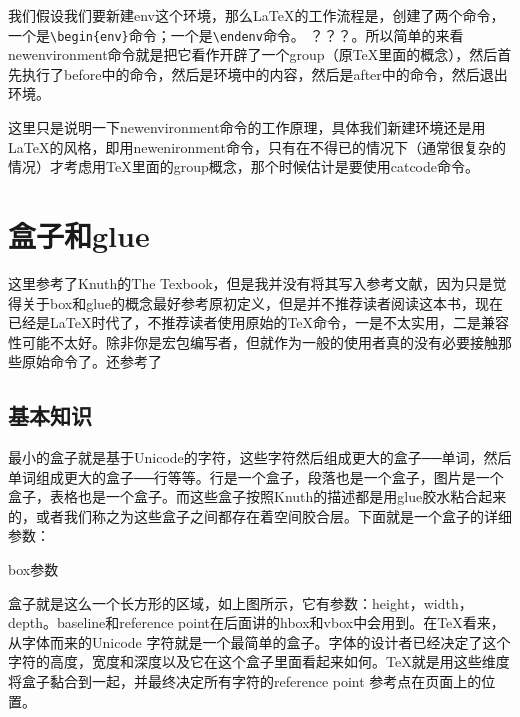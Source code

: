\documentclass[11pt,oneside]{book}
\begin{document}
\begin{common-format}
我们假设我们要新建env这个环境，那么\LaTeX 的工作流程是，创建了两个命令，一个是\verb+\begin{env}+命令；一个是\verb+\endenv+命令。{\color{red}   ？？？}。所以简单的来看newenvironment命令就是把它看作开辟了一个group（原\TeX 里面的概念），然后首先执行了before中的命令，然后是环境中的内容，然后是after中的命令，然后退出环境。

这里只是说明一下newenvironment命令的工作原理，具体我们新建环境还是用\LaTeX 的风格，即用newenironment命令，只有在不得已的情况下（通常很复杂的情况）才考虑用\TeX 里面的group概念，那个时候估计是要使用catcode命令。



\section{盒子和glue}
\label{sec:盒子和glue}
\begin{fancycolorbox}
这里参考了Knuth的The Texbook，但是我并没有将其写入参考文献，因为只是觉得关于box和glue的概念最好参考原初定义，但是并不推荐读者阅读这本书，现在已经是\LaTeX 时代了，不推荐读者使用原始的\TeX 命令，一是不太实用，二是兼容性可能不太好。除非你是宏包编写者，但就作为一般的使用者真的没有必要接触那些原始命令了。还参考了\cite{boxes}
\end{fancycolorbox}

\subsection{基本知识}
最小的盒子就是基于Unicode的字符，这些字符然后组成更大的盒子──单词，然后单词组成更大的盒子──行等等。行是一个盒子，段落也是一个盒子，图片是一个盒子，表格也是一个盒子。而这些盒子按照Knuth的描述都是用glue胶水粘合起来的，或者我们称之为这些盒子之间都存在着空间胶合层。下面就是一个盒子的详细参数：

\begin{linefig}{box参数}
\label{fig:box参数}
\end{linefig}

盒子就是这么一个长方形的区域，如上图所示，它有参数：height，width，depth。baseline和reference point在后面讲的hbox和vbox中会用到。在\TeX 看来，从字体而来的Unicode 字符就是一个最简单的盒子。字体的设计者已经决定了这个字符的高度，宽度和深度以及它在这个盒子里面看起来如何。\TeX 就是用这些维度将盒子黏合到一起，并最终决定所有字符的reference point 参考点在页面上的位置。


\end{common-format}
\end{document}
